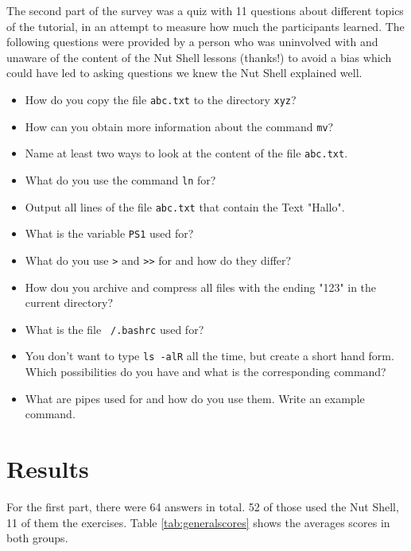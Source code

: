 \documentclass[paper=a4,abstract=on,cleardoublepage=empty,numbers=noenddot,toc=bib]{scrreprt}
\begin{document}
The second part of the survey was a quiz with 11 questions about different topics of the tutorial, in an attempt to measure how much the participants learned. The following questions were provided by a person who was uninvolved with and unaware of the content of the Nut Shell lessons (thanks!) to avoid a bias which could have led to asking questions we knew the Nut Shell explained well.

\begin{itemize}
    \item How do you copy the file \texttt{abc.txt} to the directory \texttt{xyz}?
    \item How can you obtain more information about the command \texttt{mv}?
    \item Name at least two ways to look at the content of the file \texttt{abc.txt}.
    \item What do you use the command \texttt{ln} for?
    \item Output all lines of the file \texttt{abc.txt} that contain the Text "Hallo".
    \item What is the variable \texttt{PS1} used for?
    \item What do you use \texttt{>} and \texttt{>>} for and how do they differ?
    \item How dou you archive and compress all files with the ending "123" in the current directory?
    \item What is the file \texttt{~/.bashrc} used for?
    \item You don't want to type \texttt{ls -alR} all the time, but create a short hand form. Which possibilities do you have and what is the corresponding command?
    \item What are pipes used for and how do you use them. Write an example command.
\end{itemize}

\section{Results}

For the first part, there were 64 answers in total. 52 of those used the Nut Shell, 11 of them the exercises. Table \ref{tab:generalscores} shows the averages scores in both groups.
\end{document}
